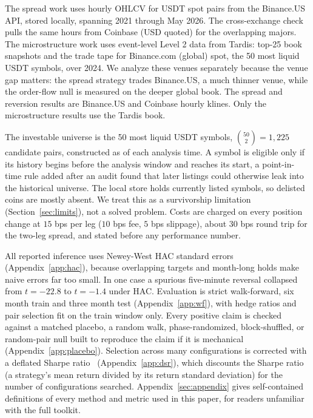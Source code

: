 \documentclass[11pt]{article}
\begin{document}
The spread work uses hourly OHLCV for USDT spot pairs from the Binance.US API, stored locally,
spanning 2021 through May 2026. The cross-exchange check pulls the same hours from Coinbase
(USD quoted) for the overlapping majors. The microstructure work uses event-level Level 2 data
from Tardis: top-25 book snapshots and the trade tape for Binance.com (global) spot, the 50 most liquid USDT
symbols, over 2024. We analyze these venues separately because the venue gap matters: the spread strategy trades Binance.US, a
much thinner venue, while the order-flow null is measured on the deeper global book. The spread and
reversion results are Binance.US and Coinbase hourly klines. Only the microstructure results use
the Tardis book.

The investable universe is the 50 most liquid USDT symbols, $\binom{50}{2}=1{,}225$ candidate
pairs, constructed as of each analysis time. A
symbol is eligible only if its history begins before the analysis window and reaches its start, a
point-in-time rule added after an audit found that later listings could otherwise leak into the
historical universe. The local store holds currently listed symbols, so delisted coins are mostly
absent. We treat this as a survivorship limitation (Section~\ref{sec:limits}), not a solved
problem. Costs are charged on every position change at $15$ bps per leg ($10$ bps fee, $5$ bps
slippage), about $30$ bps round trip for the two-leg spread, and stated before any performance
number.

All reported inference uses Newey-West HAC standard
errors~\cite{newey1987hac} (Appendix~\ref{app:hac}), because overlapping
targets and month-long holds make naive errors far too small. In one case a spurious five-minute
reversal collapsed from $t = -22.8$ to $t = -1.4$ under HAC. Evaluation is strict walk-forward,
six month train and three month test (Appendix~\ref{app:wf}), with hedge ratios and pair selection fit on the train
window only. Every positive claim is checked against a matched placebo, a random walk,
phase-randomized, block-shuffled, or random-pair null built to reproduce the claim if it is
mechanical (Appendix~\ref{app:placebo}). Selection across many configurations is corrected with a deflated Sharpe
ratio~\cite{bailey2014dsr} (Appendix~\ref{app:dsr}), which discounts the Sharpe ratio (a strategy's mean return divided by its return standard deviation) for the number of configurations searched. Appendix~\ref{sec:appendix} gives self-contained definitions of every method and metric used in this paper, for readers unfamiliar with the full toolkit.
\end{document}
